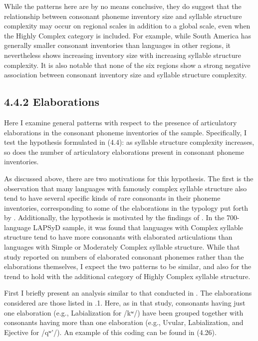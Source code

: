  While the patterns here are by no means conclusive, they do suggest that the relationship between consonant phoneme inventory size and syllable structure complexity may occur on regional scales in addition to a global scale, even when the Highly Complex category is included. For example, while South America has generally smaller consonant inventories than languages in other regions, it nevertheless shows increasing inventory size with increasing syllable structure complexity. It is also notable that none of the six regions show a strong negative association between consonant inventory size and syllable structure complexity.


\subsection{4.4.2 Elaborations}

  Here I examine general patterns with respect to the presence of articulatory elaborations in the consonant phoneme inventories of the sample. Specifically, I test the hypothesis formulated in (4.4): as syllable structure complexity increases, so does the number of articulatory elaborations present in consonant phoneme inventories.



  As discussed above, there are two motivations for this hypothesis. The first is the observation that many languages with famously complex syllable structure also tend to have several specific kinds of rare consonants in their phoneme inventories, corresponding to some of the elaborations in the typology put forth by \citet{LindblomMaddieson1988}. Additionally, the hypothesis is motivated by the findings of \citet{MaddiesonEtAl2013}. In the 700-language LAPSyD sample, it was found that languages with Complex syllable structure tend to have more consonants with elaborated articulations than languages with Simple or Moderately Complex syllable structure. While that study reported on numbers of elaborated consonant phonemes rather than the elaborations themselves, I expect the two patterns to be similar, and also for the trend to hold with the additional category of Highly Complex syllable structure.



  First I briefly present an analysis similar to that conducted in \citet{MaddiesonEtAl2013}. The elaborations considered are those listed in .1. Here, as in that study, consonants having just one elaboration (e.g., Labialization for /kʷ/) have been grouped together with consonants having more than one elaboration (e.g., Uvular, Labialization, and Ejective for /qʷ’/). An example of this coding can be found in (4.26).



